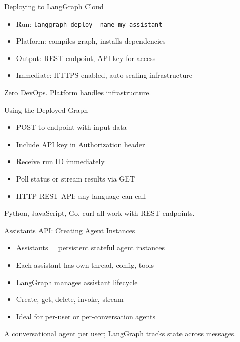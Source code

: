 \documentclass[aspectratio=169,11pt]{beamer}
\begin{document}
\begin{frame}{Deploying to LangGraph Cloud}
\setlength{\itemsep}{1pt}
\begin{itemize}
\item Run: \texttt{langgraph deploy --name my-assistant}
\item Platform: compiles graph, installs dependencies
\item Output: REST endpoint, API key for access
\item Immediate: HTTPS-enabled, auto-scaling infrastructure
\end{itemize}
\vspace{0.1cm}
\begin{tipbox}
Zero DevOps. Platform handles infrastructure.
\end{tipbox}
\end{frame}

\begin{frame}{Using the Deployed Graph}
\setlength{\itemsep}{1pt}
\begin{itemize}
\item POST to endpoint with input data
\item Include API key in Authorization header
\item Receive run ID immediately
\item Poll status or stream results via GET
\item HTTP REST API; any language can call
\end{itemize}
\vspace{0.1cm}
\begin{tipbox}
Python, JavaScript, Go, curl-all work with REST endpoints.
\end{tipbox}
\end{frame}

\begin{frame}{Assistants API: Creating Agent Instances}
\setlength{\itemsep}{1pt}
\begin{itemize}
\item Assistants = persistent stateful agent instances
\item Each assistant has own thread, config, tools
\item LangGraph manages assistant lifecycle
\item Create, get, delete, invoke, stream
\item Ideal for per-user or per-conversation agents
\end{itemize}
\vspace{0.15cm}
\begin{tipbox}
A conversational agent per user; LangGraph tracks state across messages.
\end{tipbox}
\end{frame}
\end{document}
